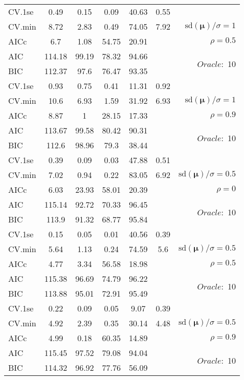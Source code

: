 \begin{table}
\begin{center}
\begin{tabular}{l*{5}{c}|r}
 \hline 
CV.1se & 0.49 & 0.15 & 0.09 & 40.63 & 0.55 & \\
CV.min & 8.72 & 2.83 & 0.49 & 74.05 & 7.92 &  $\mathrm{sd}(\mathbf{\mu})/\sigma=1$ \\
AICc & 6.7 & 1.08 & 54.75 & 20.91 & & $\rho=0.5$ \\
AIC & 114.18 & 99.19 & 78.32 & 94.66 & &  \multirow{2}{*}{$Oracle: $ 10} \\
BIC & 112.37 & 97.6 & 76.47 & 93.35 & &  \\
 \hline 
CV.1se & 0.93 & 0.75 & 0.41 & 11.31 & 0.92 & \\
CV.min & 10.6 & 6.93 & 1.59 & 31.92 & 6.93 &  $\mathrm{sd}(\mathbf{\mu})/\sigma=1$ \\
AICc & 8.87 & 1 & 28.15 & 17.33 & & $\rho=0.9$ \\
AIC & 113.67 & 99.58 & 80.42 & 90.31 & &  \multirow{2}{*}{$Oracle: $ 10} \\
BIC & 112.6 & 98.96 & 79.3 & 38.44 & &  \\
 \hline 
CV.1se & 0.39 & 0.09 & 0.03 & 47.88 & 0.51 & \\
CV.min & 7.02 & 0.94 & 0.22 & 83.05 & 6.92 &  $\mathrm{sd}(\mathbf{\mu})/\sigma=0.5$ \\
AICc & 6.03 & 23.93 & 58.01 & 20.39 & & $\rho=0$ \\
AIC & 115.14 & 92.72 & 70.33 & 96.45 & &  \multirow{2}{*}{$Oracle: $ 10} \\
BIC & 113.9 & 91.32 & 68.77 & 95.84 & &  \\
 \hline 
CV.1se & 0.15 & 0.05 & 0.01 & 40.56 & 0.39 & \\
CV.min & 5.64 & 1.13 & 0.24 & 74.59 & 5.6 &  $\mathrm{sd}(\mathbf{\mu})/\sigma=0.5$ \\
AICc & 4.77 & 3.34 & 56.58 & 18.98 & & $\rho=0.5$ \\
AIC & 115.38 & 96.69 & 74.79 & 96.22 & &  \multirow{2}{*}{$Oracle: $ 10} \\
BIC & 113.88 & 95.01 & 72.91 & 95.49 & &  \\
 \hline 
CV.1se & 0.22 & 0.09 & 0.05 & 9.07 & 0.39 & \\
CV.min & 4.92 & 2.39 & 0.35 & 30.14 & 4.48 &  $\mathrm{sd}(\mathbf{\mu})/\sigma=0.5$ \\
AICc & 4.99 & 0.18 & 60.35 & 14.89 & & $\rho=0.9$ \\
AIC & 115.45 & 97.52 & 79.08 & 94.04 & &  \multirow{2}{*}{$Oracle: $ 10} \\
BIC & 114.32 & 96.92 & 77.76 & 56.09 & &  \\
 \hline 
\end{tabular}
\end{center}
\vspace{-1cm}
\end{table}




